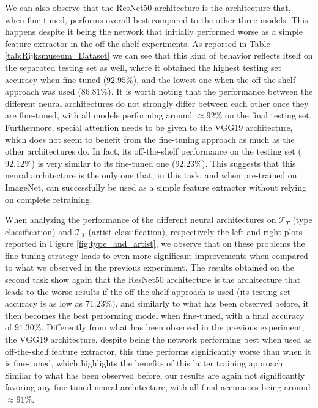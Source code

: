 We can also observe that the ResNet50 architecture is the architecture that, when fine-tuned, performs overall best compared to the other three models. This happens despite it being the network that initially performed worse as a simple feature extractor in the off-the-shelf experiments. As reported in Table \ref{tab:Rijksmuseum_Dataset} we can see that this kind of behavior reflects itself on the separated testing set as well, where it obtained the highest testing set accuracy when fine-tuned ($92.95\%$), and the lowest one when the off-the-shelf approach was used ($86.81\%$). It is worth noting that the performance between the different neural architectures do not strongly differ between each other once they are fine-tuned, with all models performing around $\approx 92\%$ on the final testing set. Furthermore, special attention needs to be given to the VGG19 architecture, which does not seem to benefit from the fine-tuning approach as much as the other architectures do. In fact, its off-the-shelf performance on the testing set ($92.12\%$) is very similar to its fine-tuned one ($92.23\%$). This suggests that this neural architecture is the only one that, in this task, and when pre-trained on ImageNet, can successfully be used as a simple feature extractor without relying on complete retraining. 

When analyzing the performance of the different neural architectures on $\mathcal{T}_T$  (type classification) and $\mathcal{T}_T$  (artist classification), respectively the left and right plots reported in Figure \ref{fig:type_and_artist}, we observe that on these problems the fine-tuning strategy leads to even more significant improvements when compared to what we observed in the previous experiment. The results obtained on the second task show again that the ResNet50 architecture is the architecture that leads to the worse results if the off-the-shelf approach is used (its testing set accuracy is as low as $71.23\%$), and similarly to what has been observed before, it then becomes the best performing model when fine-tuned, with a final accuracy of $91.30\%$. Differently from what has been observed in the previous experiment, the VGG19 architecture, despite being the network performing best when used as off-the-shelf feature extractor, this time performs significantly worse than when it is fine-tuned, which highlights the benefits of this latter training approach. Similar to what has been observed before, our results are again not significantly favoring any fine-tuned neural architecture, with all final accuracies being around $\approx 91\%$.

